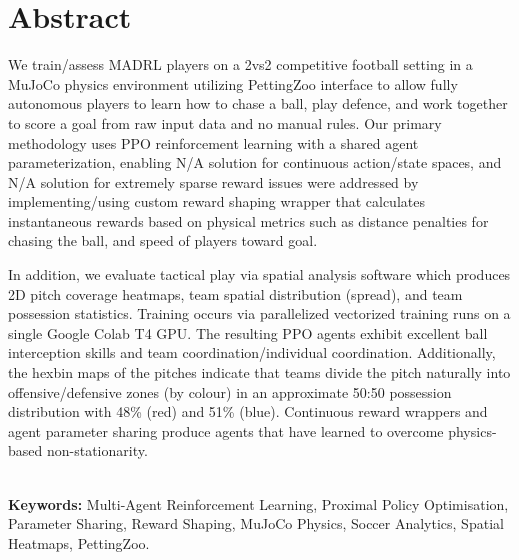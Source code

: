 \chapter*{\center \Large  Abstract}

We train/assess MADRL players on a 2vs2 competitive football setting in a MuJoCo physics environment utilizing PettingZoo interface to allow fully autonomous players to learn how to chase a ball, play defence, and work together to score a goal from raw input data and no manual rules. Our primary methodology uses PPO reinforcement learning with a shared agent parameterization, enabling N/A solution for continuous action/state spaces, and N/A solution for extremely sparse reward issues were addressed by implementing/using custom reward shaping wrapper that calculates instantaneous rewards based on physical metrics such as distance penalties for chasing the ball, and speed of players toward goal.

In addition, we evaluate tactical play via spatial analysis software which produces 2D pitch coverage heatmaps, team spatial distribution (spread), and team possession statistics. Training occurs via parallelized vectorized training runs on a single Google Colab T4 GPU. The resulting PPO agents exhibit excellent ball interception skills and team coordination/individual coordination. Additionally, the hexbin maps of the pitches indicate that teams divide the pitch naturally into offensive/defensive zones (by colour) in an approximate 50:50 possession distribution with 48\% (red) and 51\% (blue). Continuous reward wrappers and agent parameter sharing produce agents that have learned to overcome physics-based non-stationarity.


~\\[1cm]
\noindent
\textbf{Keywords:} Multi-Agent Reinforcement Learning, Proximal Policy Optimisation, Parameter Sharing, Reward Shaping, MuJoCo Physics, Soccer Analytics, Spatial Heatmaps, PettingZoo.
